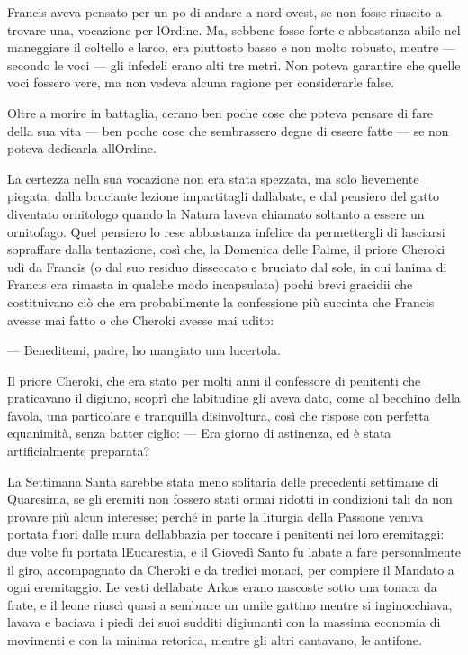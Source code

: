 Francis aveva pensato per un po\textquotesingle{} di andare a
nord-ovest, se non fosse riuscito a trovare una, vocazione per
l\textquotesingle Ordine. Ma, sebbene fosse forte e abbastanza abile nel
maneggiare il coltello e l\textquotesingle arco, era piuttosto basso e
non molto robusto, mentre --- secondo le voci --- gli infedeli erano
alti tre metri. Non poteva garantire che quelle voci fossero vere, ma
non vedeva alcuna ragione per considerarle false.

Oltre a morire in battaglia, c\textquotesingle erano ben poche cose che
poteva pensare di fare della sua vita --- ben poche cose che sembrassero
degne di essere fatte --- se non poteva dedicarla
all\textquotesingle Ordine.

La certezza nella sua vocazione non era stata spezzata, ma solo
lievemente piegata, dalla bruciante lezione impartitagli
dall\textquotesingle abate, e dal pensiero del gatto diventato
ornitologo quando la Natura l\textquotesingle aveva chiamato soltanto a
essere un ornitofago. Quel pensiero lo rese abbastanza infelice da
permettergli di lasciarsi sopraffare dalla tentazione, così che, la
Domenica delle Palme, il priore Cheroki udì da Francis (o dal suo
residuo disseccato e bruciato dal sole, in cui l\textquotesingle anima
di Francis era rimasta in qualche modo incapsulata) pochi brevi gracidii
che costituivano ciò che era probabilmente la confessione più succinta
che Francis avesse mai fatto o che Cheroki avesse mai udito:

--- Beneditemi, padre, ho mangiato una lucertola.

Il priore Cheroki, che era stato per molti anni il confessore di
penitenti che praticavano il digiuno, scoprì che
l\textquotesingle abitudine gli aveva dato, come al becchino della
favola, una particolare e tranquilla disinvoltura, così che rispose con
perfetta equanimità, senza batter ciglio: --- Era giorno di astinenza,
ed è stata artificialmente preparata?

La Settimana Santa sarebbe stata meno solitaria delle precedenti
settimane di Quaresima, se gli eremiti non fossero stati ormai ridotti
in condizioni tali da non provare più alcun interesse; perché in parte
la liturgia della Passione veniva portata fuori dalle mura
dell\textquotesingle abbazia per toccare i penitenti nei loro
eremitaggi: due volte fu portata l\textquotesingle Eucarestia, e il
Giovedì Santo fu l\textquotesingle abate a fare personalmente il giro,
accompagnato da Cheroki e da tredici monaci, per compiere il Mandato a
ogni eremitaggio. Le vesti dell\textquotesingle abate Arkos erano
nascoste sotto una tonaca da frate, e il leone riuscì quasi a sembrare
un umile gattino mentre si inginocchiava, lavava e baciava i piedi dei
suoi sudditi digiunanti con la massima economia di movimenti e con la
minima retorica, mentre gli altri cantavano, le antifone.

